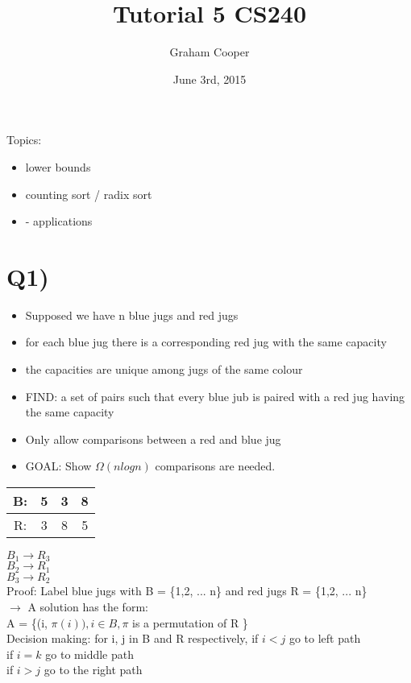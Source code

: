 \documentclass[12pt]{article}
\title{\vspace{-15ex}Tutorial 5 CS240\vspace{-1ex}}
\date{June 3rd, 2015}
\author{Graham Cooper}
\begin{document}
	\maketitle
	
	Topics:
	\begin{itemize}
		\item lower bounds
		\item counting sort / radix sort
		\item  - applications
	\end{itemize}
	
	\section*{Q1)}
	
	\begin{itemize}
		\item Supposed we have n blue jugs and red jugs
		\item for each blue jug there is a corresponding red jug with the same capacity
		\item the capacities are unique among jugs of the same colour
		\item FIND: a set of pairs such that every blue jub is paired with a red jug having the same capacity
		\item Only allow comparisons between a red and blue jug
		\item GOAL: Show $\Omega(nlogn)$ comparisons are needed.
	\end{itemize}
	
	\begin{tabular}{ c | c | c | c |}
		\hline
		B: & 5 & 3 & 8 \\ \hline
		R: & 3 & 8 & 5 \\ \hline
	\end{tabular}
	
	$B_1 \rightarrow R_3$\\
	$B_2 \rightarrow R_1$\\
	$B_3 \rightarrow R_2$\\
	
	Proof: Label blue jugs with B = \{1,2, ... n\} and red jugs R = \{1,2, ... n\}\\
	$\rightarrow$ A solution has the form:\\
	A = \{(i, $\pi(i)), i \in B, \pi$ is a permutation of R \}\\
	
	Decision making:
	for i, j in B and R respectively,
	if $i < j$ go to left path\\
	if $i = k$ go to middle path\\
	if $i > j$ go to the right path\\
	
\end{document}
